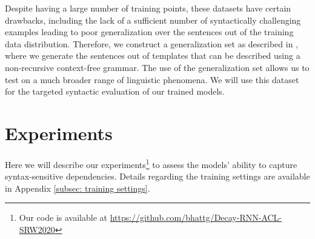 \documentclass[11pt,a4paper]{article}
\begin{document}
Despite having a large number of training points, these datasets have certain drawbacks, including the lack of a sufficient number of syntactically challenging examples leading to poor generalization over the sentences out of the training data distribution. Therefore, we construct a generalization set as described in \citet{marvin2018targeted}, where we generate the sentences out of templates that can be described using a non-recursive context-free grammar. The use of the generalization set allows us to test on a much broader range of linguistic phenomena. We will use this dataset for the targeted syntactic evaluation of our trained models.

\section{Experiments}
\label{sec:Experiments}
Here we will describe our experiments\footnote{Our code is available at \hyperlink{https://github.com/bhattg/Decay-RNN-ACL-SRW2020}{https://github.com/bhattg/Decay-RNN-ACL-SRW2020}} to assess the models' ability to capture syntax-sensitive dependencies. Details regarding the training settings are available in  Appendix \ref{subsec: training settings}. 
\end{document}
